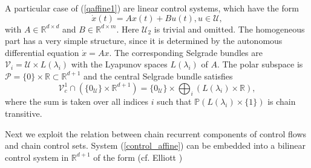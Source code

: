 	\begin{remark}
		\label{Remark_linear} A particular case of (\ref{qaffine1}) are linear control
		systems, which have the form
		\begin{equation}
			\dot{x}(t)=Ax(t)+Bu(t),u\in\mathcal{U}, \label{control_linear}%
		\end{equation}
		with $A\in\mathbb{R}^{d\times d}$ and $B\in\mathbb{R}^{d\times m}$. Here
		$\mathcal{U}_{2}$ is trivial and omitted. The homogeneous part has a very
		simple structure, since it is determined by the autonomous differential
		equation $\dot{x}=Ax$. The corresponding Selgrade bundles are $\mathcal{V}%
		_{i}=\mathcal{U}\times L(\lambda_{i})$ with the Lyapunov spaces $L(\lambda
		_{i})$ of $A$. The polar subspace is $\mathcal{P}=\{0\}\times\mathbb{R}%
		\subset\mathbb{R}^{d+1}$ and the central Selgrade bundle satisfies
		\[
		\mathcal{V}_{c}^{1}\cap\left(  \{0_{\mathcal{U}}\}\times\mathbb{R}%
		^{d+1}\right)  =\{0_{\mathcal{U}}\}\times\bigoplus\nolimits_{i}\left(
		L(\lambda_{i})\times\mathbb{R}\right)  ,
		\]
		where the sum is taken over all indices $i$ such that $\mathbb{P}%
		(L(\lambda_{i})\times\{1\})$ is chain transitive.
	\end{remark}
	
	Next we exploit the relation between chain recurrent components of control
	flows and chain control sets. System (\ref{control_affine}) can be embedded
	into a bilinear control system in $\mathbb{R}^{d+1}$ of the form (cf. Elliott
	\cite[Subsection 3.8.1]{Elliott})%
	
